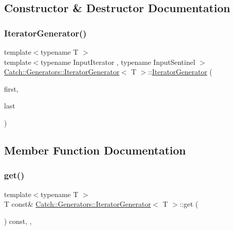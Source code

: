 \subsection{Constructor \& Destructor Documentation}
\mbox{\label{class_catch_1_1_generators_1_1_iterator_generator_a1f795b1bbd515274673115c0a9fc2e54}} 
\subsubsection{\texorpdfstring{Iterator\+Generator()}{IteratorGenerator()}}
{\footnotesize\ttfamily template$<$typename T $>$ \\
template$<$typename Input\+Iterator , typename Input\+Sentinel $>$ \\
\mbox{\hyperlink{class_catch_1_1_generators_1_1_iterator_generator}{Catch\+::\+Generators\+::\+Iterator\+Generator}}$<$ T $>$\+::\mbox{\hyperlink{class_catch_1_1_generators_1_1_iterator_generator}{Iterator\+Generator}} (\begin{DoxyParamCaption}\item[{Input\+Iterator}]{first,  }\item[{Input\+Sentinel}]{last }\end{DoxyParamCaption})\hspace{0.3cm}{\ttfamily [inline]}}



\subsection{Member Function Documentation}
\mbox{\label{class_catch_1_1_generators_1_1_iterator_generator_a61688118e5caba23340b4b949c3bb7e4}} 
\subsubsection{\texorpdfstring{get()}{get()}}
{\footnotesize\ttfamily template$<$typename T $>$ \\
T const\& \mbox{\hyperlink{class_catch_1_1_generators_1_1_iterator_generator}{Catch\+::\+Generators\+::\+Iterator\+Generator}}$<$ T $>$\+::get (\begin{DoxyParamCaption}{ }\end{DoxyParamCaption}) const\hspace{0.3cm}{\ttfamily [inline]}, {\ttfamily [override]}, {\ttfamily [virtual]}}



